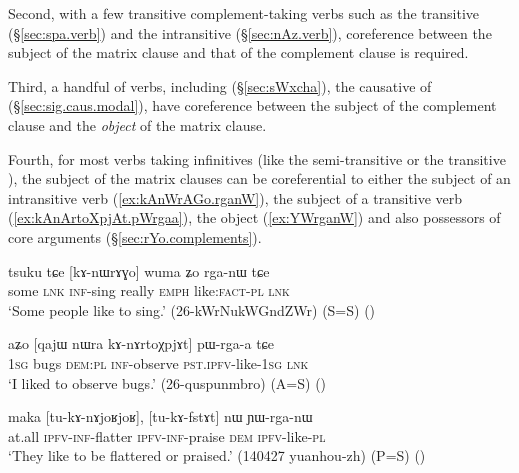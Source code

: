 Second, with a few transitive complement-taking verbs such as the transitive  (§\ref{sec:spa.verb}) and the intransitive  (§\ref{sec:nAz.verb}), coreference between the subject of the matrix clause and that of the complement clause is required. 

Third, a handful of verbs, including  (§\ref{sec:sWxcha}), the causative of  (§\ref{sec:sig.caus.modal}), have coreference between the subject of the complement clause and the \textit{object} of the matrix clause.

Fourth, for most verbs taking infinitives (like the semi-transitive  or the transitive ),  the subject of the matrix clauses can be coreferential to either the subject of an intransitive verb (\ref{ex:kAnWrAGo.rganW}), the subject of a transitive verb (\ref{ex:kAnArtoXpjAt.pWrgaa}), the object (\ref{ex:YWrganW}) and also possessors of core arguments (§\ref{sec:rYo.complements}).

\begin{exe}
   \ex   \label{ex:kAnWrAGo.rganW} 
\gll tsuku tɕe [kɤ-nɯrɤɣo] wuma ʑo rga-nɯ tɕe \\
some \textsc{lnk} \textsc{inf}-sing really \textsc{emph} like:\textsc{fact}-\textsc{pl}  \textsc{lnk} \\
\glt `Some people like to sing.' (26-kWrNukWGndZWr)  (S=S)
()
\end{exe}  
 
\begin{exe}
\ex   \label{ex:kAnArtoXpjAt.pWrgaa} 
\gll aʑo [qajɯ nɯra kɤ-nɤrtoχpjɤt] pɯ-rga-a tɕe  	\\
  	\textsc{1sg} bugs \textsc{dem}:\textsc{pl} \textsc{inf}-observe \textsc{pst}.\textsc{ipfv}-like-\textsc{1sg} \textsc{lnk}  \\
 \glt `I liked to observe bugs.' (26-quspunmbro) (A=S)
()
\end{exe}  
 
\begin{exe}
   \ex   \label{ex:YWrganW} 
\gll maka [tu-kɤ-nɤjoʁjoʁ], [tu-kɤ-fstɤt] nɯ ɲɯ-rga-nɯ  \\
at.all \textsc{ipfv}-\textsc{inf}-flatter \textsc{ipfv}-\textsc{inf}-praise \textsc{dem} \textsc{ipfv}-like-\textsc{pl} \\
\glt `They like to be flattered or praised.' (140427 yuanhou-zh) (P=S)
()
\end{exe}  


